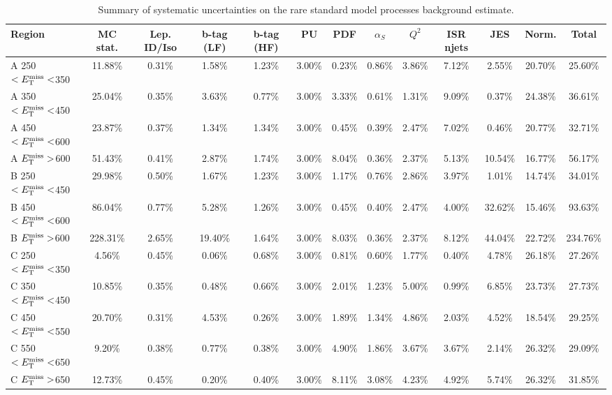 \begin{table}
\centering
\footnotesize
\caption{Summary of systematic uncertainties on the rare standard
  model processes background estimate.}
\label{tab:stop:rarebkg:systematics}
\begin{tabular}{|l|ccccccccccc|c|}
\hline
Region & MC stat.   &   Lep. ID/Iso   &   b-tag (LF) &   b-tag (HF)  &   PU &   PDF &   $\alpha_S$ &   $Q^2$ &   ISR njets  & JES &   Norm.  & Total \\
\hline
 A 250$<E_\text{T}^\text{miss}<$350 & 11.88\% & 0.31\%  & 1.58\%  & 1.23\%  & 3.00\%  & 0.23\%  & 0.86\%  & 3.86\%  & 7.12\%  & 2.55\%  & 20.70\% & 25.60\% \\
 A 350$<E_\text{T}^\text{miss}<$450 & 25.04\% & 0.35\%  & 3.63\%  & 0.77\%  & 3.00\%  & 3.33\%  & 0.61\%  & 1.31\%  & 9.09\%  & 0.37\%  & 24.38\% & 36.61\% \\
 A 450$<E_\text{T}^\text{miss}<$600 & 23.87\% & 0.37\%  & 1.34\%  & 1.34\%  & 3.00\%  & 0.45\%  & 0.39\%  & 2.47\%  & 7.02\%  & 0.46\%  & 20.77\% & 32.71\% \\
 A $E_\text{T}^\text{miss}>$600     & 51.43\% & 0.41\%  & 2.87\%  & 1.74\%  & 3.00\%  & 8.04\%  & 0.36\%  & 2.37\%  & 5.13\%  & 10.54\% & 16.77\% & 56.17\% \\
 B 250$<E_\text{T}^\text{miss}<$450 & 29.98\% & 0.50\%  & 1.67\%  & 1.23\%  & 3.00\%  & 1.17\%  & 0.76\%  & 2.86\%  & 3.97\%  & 1.01\%  & 14.74\% & 34.01\% \\
 B 450$<E_\text{T}^\text{miss}<$600 & 86.04\% & 0.77\%  & 5.28\%  & 1.26\%  & 3.00\%  & 0.45\%  & 0.40\%  & 2.47\%  & 4.00\%  & 32.62\% & 15.46\% & 93.63\% \\
 B $E_\text{T}^\text{miss}>$600     & 228.31\%& 2.65\%  & 19.40\% & 1.64\%  & 3.00\%  & 8.03\%  & 0.36\%  & 2.37\%  & 8.12\%  & 44.04\% & 22.72\% & 234.76\%\\
 C 250$<E_\text{T}^\text{miss}<$350 & 4.56\%  & 0.45\%  & 0.06\%  & 0.68\%  & 3.00\%  & 0.81\%  & 0.60\%  & 1.77\%  & 0.40\%  & 4.78\%  & 26.18\% & 27.26\% \\
 C 350$<E_\text{T}^\text{miss}<$450 & 10.85\% & 0.35\%  & 0.48\%  & 0.66\%  & 3.00\%  & 2.01\%  & 1.23\%  & 5.00\%  & 0.99\%  & 6.85\%  & 23.73\% & 27.73\% \\
 C 450$<E_\text{T}^\text{miss}<$550 & 20.70\% & 0.31\%  & 4.53\%  & 0.26\%  & 3.00\%  & 1.89\%  & 1.34\%  & 4.86\%  & 2.03\%  & 4.52\%  & 18.54\% & 29.25\% \\
 C 550$<E_\text{T}^\text{miss}<$650 & 9.20\%  & 0.38\%  & 0.77\%  & 0.38\%  & 3.00\%  & 4.90\%  & 1.86\%  & 3.67\%  & 3.67\%  & 2.14\%  & 26.32\% & 29.09\% \\
 C $E_\text{T}^\text{miss}>$650     & 12.73\% & 0.45\%  & 0.20\%  & 0.40\%  & 3.00\%  & 8.11\%  & 3.08\%  & 4.23\%  & 4.92\%  & 5.74\%  & 26.32\% & 31.85\% \\

\end{tabular}
\end{table}
